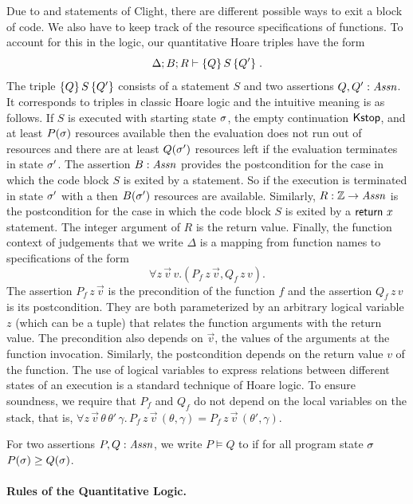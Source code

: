 \documentclass{sigplanconf}
\begin{document}
{Due to  and  statements of Clight, there are
different possible ways to exit a block of code.  We also have to keep
track of the resource specifications of functions.  To account for
this in the logic, our quantitative Hoare triples have the form
$$
\Delta; B; R \vdash
\{ Q \}\,  S \, \{ Q' \} \; .
$$
The triple $\{ Q \}\,  S \, \{ Q' \}$ consists of a statement $S$ and
two assertions $Q,Q' : \mathit{Assn}$.  It corresponds to triples in classic
Hoare logic and the intuitive meaning is as follows.  If $S$ is
executed with starting state $\sigma$, the empty continuation
$\mathsf{Kstop}$, and at least $P(\sigma)$ resources available then the
evaluation does not run out of resources and there are at least
$Q(\sigma')$ resources left if the evaluation terminates in state
$\sigma'$.  The assertion $B : \mathit{Assn}$ provides the
postcondition for the case in which the code block $S$ is exited by a
 statement.  So if the execution is terminated in state
$\sigma'$ with a  then $B(\sigma')$ resources are
available.  Similarly, $R : \mathbb{Z} \to \mathit{Assn}$ is the postcondition for the
case in which the code block $S$ is exited by a $\mathsf{return}~x$
statement.  The integer argument of $R$ is the return value.
Finally, the function context of judgements that we write $\Delta$ is
a mapping from function names to specifications of the form
$$
  \forall z \, \vec v \, v .(P_f \, z \, \vec v, Q_f \, z \, v).
$$
The assertion $P_f \, z \, \vec v$ is the precondition of the function
$f$ and the assertion $Q_f \, z \, v$ is its postcondition.  They are
both parameterized by an arbitrary logical variable $z$ (which can be a
tuple) that relates the function arguments with the return value.  The
precondition also depends on $\vec v$, the values of the arguments
at the function invocation.  Similarly, the postcondition depends on
the return value $v$ of the function.  The use of logical variables to
express relations between different states of an execution is a
standard technique of Hoare logic.
%
To ensure soundness, we require that $P_f$ and $Q_f$ do not depend on
the local variables on the stack, that is, $\forall z \, \vec v
\, \theta \, \theta' \, \gamma . \, P_f \, z \, \vec v \,
(\theta,\gamma) = P_f \, z \, \vec v \, (\theta',\gamma)$.

For two assertions $P,Q : \mathit{Assn}$, we write $P \models Q$ to if for all
program state $\sigma$ $P(\sigma) \ge Q(\sigma)$.

\paragraph{Rules of the Quantitative Logic.}

}
\end{document}
